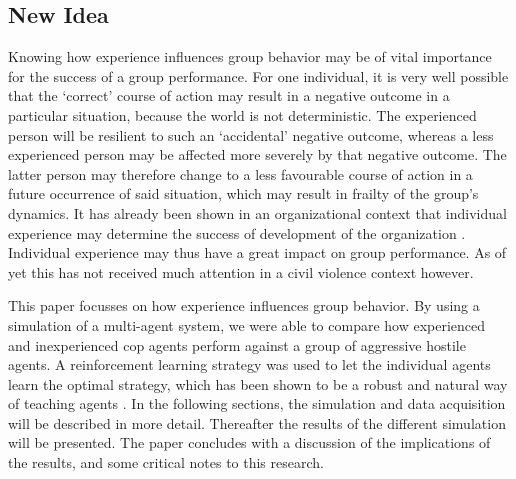\subsection{New Idea}
Knowing how experience influences group behavior may be of vital importance for the success of a group performance. For one individual, it is very well possible that the `correct' course of action may result in a negative outcome in a particular situation, because the world is not deterministic. The experienced person will be resilient to such an `accidental' negative outcome, whereas a less experienced person may be affected more severely by that negative outcome. The latter person may therefore change to a less favourable course of action in a future occurrence of said situation, which may result in frailty of the group's dynamics. It has already been shown in an organizational context that individual experience may determine the success of development of the organization \citep*{reagans2005individual}. Individual experience may thus have a great impact on group performance. As of yet this has not received much attention in a civil violence context however. 

This paper focusses on how experience influences group behavior. By using a simulation of a multi-agent system, we were able to compare how experienced and inexperienced cop agents perform against a group of aggressive hostile agents. A reinforcement learning strategy was used to let the individual agents learn the optimal strategy, which has been shown to be a robust and natural way of teaching agents \citep{claus1998dynamics}. In the following sections, the simulation and data acquisition will be described in more detail. Thereafter the results of the different simulation will be presented. The paper concludes with a discussion of the implications of the results, and some critical notes to this research. 